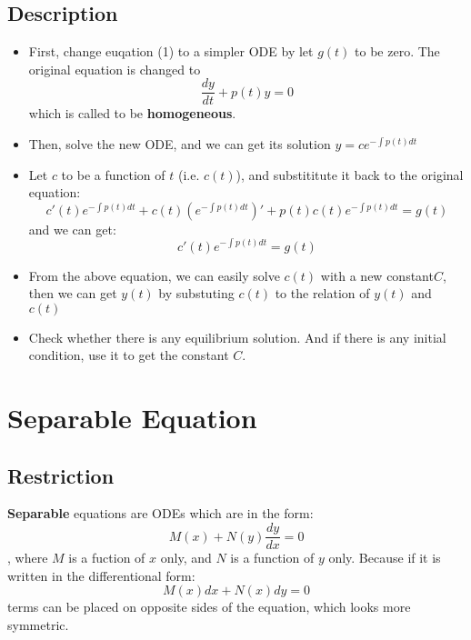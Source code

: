 \documentclass{article}
\begin{document}
\subsection{Description}
\begin{itemize}
	\item First, change euqation (1) to a simpler ODE by let $g(t)$ to be zero. The original equation is changed to 
	\begin{equation}
			\frac{dy}{dt}+p(t)y = 0
	\end{equation}
	which is called to be \textbf{homogeneous}.
	\item Then, solve the new ODE, and we can get its solution $y = ce^{-\int p(t)dt}$
	\item Let $c$ to be a function of $t$ (i.e. $c(t)$), and substititute it back to the original equation:
	\[c'(t)e^{-\int p(t)dt} + c(t)(e^{-\int p(t)dt})' + p(t)c(t)e^{-\int p(t)dt} = g(t)\]
	and we can get:
	\begin{equation}
		c'(t)e^{-\int p(t)dt} = g(t)
	\end{equation}
	\item From the above equation, we can easily solve $c(t)$ with a new constant$C$, then we can get $y(t)$ by substuting $c(t)$ to the relation of $y(t)$ and $c(t)$
	\item Check whether there is any equilibrium solution. And if there is any initial condition, use it to get the constant $C$.
\end{itemize}

\section{Separable Equation}
\subsection{Restriction}
\textbf{Separable} equations are ODEs which are in the form:
\begin{equation}
	M(x)+N(y)\frac{dy}{dx} = 0
\end{equation}
, where $M$ is a fuction of $x$ only, and $N$ is a function of $y$ only. Because if it is written in the differentional form:
\begin{equation}
	M(x)dx+N(x)dy = 0
\end{equation}
terms can be placed on opposite sides of the equation, which looks more symmetric.
\end{document}
